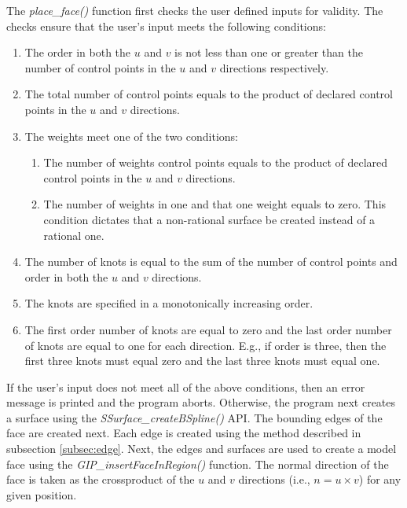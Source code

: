 \documentclass[a4paper, 12pt]{article}
\begin{document}
The \emph{place\_face()} function first checks the user defined inputs
for validity. The checks ensure that the user's input meets the 
following conditions:
\begin{enumerate}
  \item The order in both the $u$ and $v$ is not less than one 
      or greater than
      the number of control points in the $u$ and $v$ 
      directions respectively. 
  \item The total number of control points equals to the product of 
      declared control points in the $u$ and $v$ directions.
  \item The weights meet one of the two conditions:
  \begin{enumerate}
    \item The number of weights control points equals to the product of 
        declared control points in the $u$ and $v$ directions.
    \item The number of weights in one and that one weight equals to zero. 
        This condition dictates that a non-rational surface be created 
        instead of a rational one.
  \end{enumerate}
  \item The number of knots is equal to the sum of the number of 
      control points
      and order in both the $u$ and $v$ directions.
  \item The knots are specified in a monotonically increasing order. 
  \item The first order number of knots are equal to zero and 
      the last order number 
      of knots are equal to one for each direction. 
      E.g., if order is three, then the first three
      knots must equal zero and the last three knots must equal one.
\end{enumerate}

If the user's input does not meet all of the above conditions, then
an error message is printed and the program aborts. Otherwise, 
the program next creates a surface using the 
\emph{SSurface\_createBSpline()} 
API. The bounding edges of the face are created next. 
Each edge is created using the method described in 
subsection \ref{subsec:edge}. Next, the edges and surfaces are used to 
create a model face using the \emph{GIP\_insertFaceInRegion()} function. 
The normal direction of the face is taken as the crossproduct of 
the $u$ and $v$ directions (i.e., $n=u\times v$) for any given position. 
\end{document}
